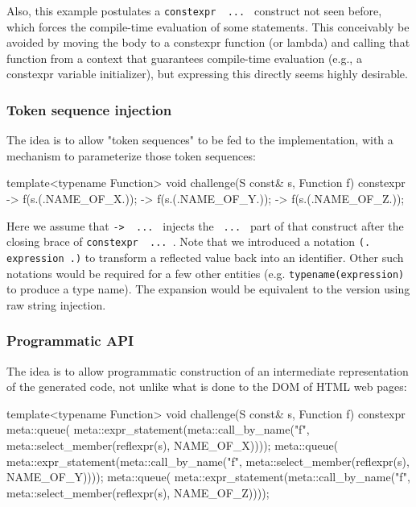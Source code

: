 \documentclass{wg21}
\newcommand{\cc}[1]{\texttt{#1}}
\begin{document}
Also, this example postulates a \cc{constexpr { ... }} construct not seen before,
which forces the compile-time evaluation of some statements. This conceivably be
avoided by moving the body to a constexpr function (or lambda) and calling that
function from a context that guarantees compile-time evaluation (e.g., a constexpr
variable initializer), but expressing this directly seems highly desirable.


\subsubsection{Token sequence injection}
The idea is to allow "token sequences" to be fed to the implementation, with
a mechanism to parameterize those token sequences:

\begin{cpp}
template<typename Function>
void challenge(S const& s, Function f) {
  constexpr {
    -> { f(s.(.NAME_OF_X.)); }
    -> { f(s.(.NAME_OF_Y.)); }
    -> { f(s.(.NAME_OF_Z.)); }
  }
}
\end{cpp}

Here we assume that \cc{-> { ... }} injects the \cc{{ ... }} part of that
construct after the closing brace of \cc{constexpr { ... }}. Note that we
introduced a notation \cc{(. expression .)} to transform a reflected value
back into an identifier. Other such notations would be required for a few
other entities (e.g. \cc{typename(expression)} to produce a type name). The
expansion would be equivalent to the version using raw string injection.


\subsubsection{Programmatic API}
The idea is to allow programmatic construction of an intermediate representation
of the generated code, not unlike what is done to the DOM of HTML web pages:

\begin{cpp}
template<typename Function>
void challenge(S const& s, Function f) {
  constexpr {
    meta::queue(
      meta::expr_statement(meta::call_by_name("f",
        meta::select_member(reflexpr(s), NAME_OF_X))));
    meta::queue(
      meta::expr_statement(meta::call_by_name("f",
        meta::select_member(reflexpr(s), NAME_OF_Y))));
    meta::queue(
      meta::expr_statement(meta::call_by_name("f",
        meta::select_member(reflexpr(s), NAME_OF_Z))));
  }
}
\end{cpp}
\end{document}
